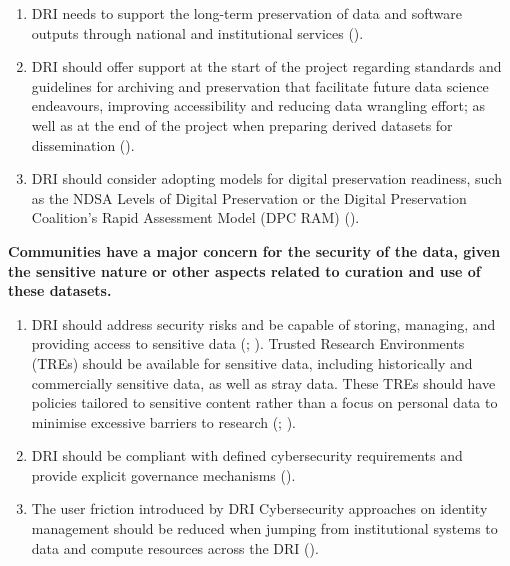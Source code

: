 \documentclass[11pt]{scrartcl}
\begin{document}
\begin{enumerate}[resume]
\item DRI needs to support the long-term preservation of data and software outputs through national and institutional services (\cite[8]{
beavan_2025b_15083632}).

\item DRI should offer support at the start of the project regarding standards and guidelines for archiving and preservation that facilitate future data science endeavours, improving accessibility and reducing data wrangling effort; as well as at the end of the project when preparing derived datasets for dissemination 
(\cite[4,18]{de_roure_2022_4716148}).

\item DRI should consider adopting models for digital preservation readiness, such as the NDSA Levels of Digital Preservation or the Digital Preservation Coalition's Rapid Assessment Model (DPC RAM) (\cite[4,21]{Zwiggelaar22}).  
\end{enumerate}

\noindent\textbf{Communities have a major concern for the security of the data, given the sensitive nature or other aspects related to curation and use of these datasets.} 

\begin{enumerate}[resume]
\item\label{itm:sec} DRI should address security risks and be capable of storing, managing, and providing access to sensitive data 
(\cite{de_roure_2022_4716148}; \cite[5]{wrro203045}). Trusted Research Environments (TREs) should be available for sensitive data, including historically and commercially sensitive data, as well as stray data. These TREs should have policies tailored to sensitive content rather than a focus on personal data to minimise excessive barriers to research 
(\cite[4]{de_roure_2022_4716148}; \cite[5]{Zwiggelaar22}).

\item\label{itm:cyb} DRI should be compliant with defined cybersecurity requirements and provide explicit governance mechanisms (\cite[5,6]{collier25}).  


\item The user friction introduced by DRI Cybersecurity approaches on identity management should be reduced when jumping from institutional systems to data and compute resources across the DRI (\cite[21]{collier25}).  
\end{enumerate}
\end{document}
